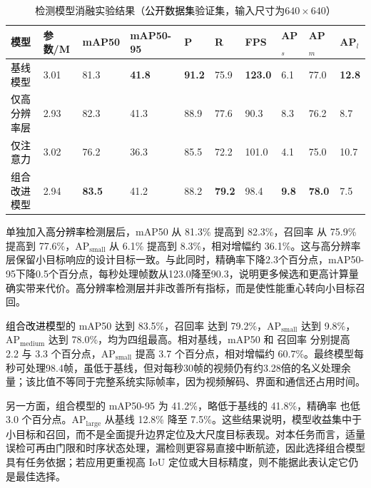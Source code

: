 \begin{table}[htbp]
\centering
\caption{检测模型消融实验结果（\textcolor{black}{公开数据集}验证集，输入尺寸为$640\times640$）}
\label{tab:ch5_ablation}
\scriptsize
\setlength{\tabcolsep}{3pt}
\begin{tabularx}{\textwidth}{P{0.17\textwidth} Q Q Q Q Q Q Q Q Q}
\toprule
\textbf{模型} & \textbf{参数/M} & \textbf{mAP50} & \textbf{mAP50-95} & \textbf{P} & \textbf{R} & \textbf{FPS} & \textbf{AP$_{s}$} & \textbf{AP$_{m}$} & \textbf{AP$_{l}$} \\
\midrule
\textcolor{black}{基线模型} & 3.01 & 81.3 & \textbf{41.8} & \textbf{91.2} & 75.9 & \textbf{123.0} & 6.1 & 77.0 & \textbf{12.8} \\
\textcolor{black}{仅高分辨率层} & 2.93 & 82.3 & 41.3 & 88.9 & 77.6 & 90.3 & 8.3 & 76.2 & 8.7 \\
\textcolor{black}{仅注意力} & 3.02 & 76.2 & 36.3 & 85.5 & 72.2 & 101.0 & 4.1 & 75.0 & 10.7 \\
\textcolor{black}{组合改进模型} & 2.94 & \textbf{83.5} & 41.2 & 88.2 & \textbf{79.2} & 98.4 & \textbf{9.8} & \textbf{78.0} & 7.5 \\
\bottomrule
\end{tabularx}
\end{table}

单独加入\textcolor{black}{高分辨率检测层}后，mAP50 从 81.3\% 提高到 82.3\%，召回率 从 75.9\% 提高到 77.6\%，AP$_{\mathrm{small}}$ 从 6.1\% 提高到 8.3\%，相对增幅约 36.1\%。这与高分辨率层保留小目标响应的设计目标一致。与此同时，精确率下降2.3个百分点，mAP50-95下降0.5个百分点，每秒处理帧数从123.0降至90.3，说明更多候选和更高计算量确实带来代价。\textcolor{black}{高分辨率检测层}并非改善所有指标，而是使性能重心转向小目标召回。

\textcolor{black}{组合改进模型}的 mAP50 达到 83.5\%，召回率 达到 79.2\%，AP$_{\mathrm{small}}$ 达到 9.8\%，AP$_{\mathrm{medium}}$ 达到 78.0\%，均为四组最高。相对基线，mAP50 和 召回率 分别提高 2.2 与 3.3 个百分点，AP$_{\mathrm{small}}$ 提高 3.7 个百分点，相对增幅约 60.7\%。最终模型每秒可处理98.4帧，虽低于基线，但对每秒30帧的视频仍有约3.28倍的名义处理余量；该比值不等同于完整系统实际帧率，因为视频解码、界面和通信还占用时间。

另一方面，组合模型的 mAP50-95 为 41.2\%，略低于基线的 41.8\%，精确率 也低 3.0 个百分点。AP$_{\mathrm{large}}$ 从基线 12.8\% 降至 7.5\%。这些结果说明，模型收益集中于小目标和召回，而不是全面提升边界定位及大尺度目标表现。对本任务而言，适量误检可再由门限和时序状态处理，漏检则更容易直接中断航迹，因此选择组合模型具有任务依据；若应用更重视高 IoU 定位或大目标精度，则不能据此表认定它仍是最佳选择。

